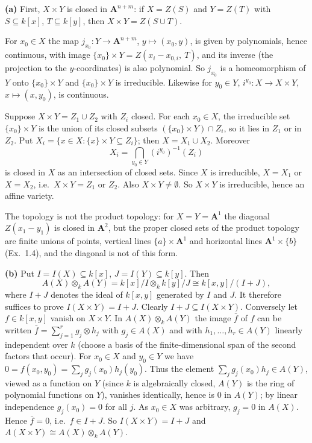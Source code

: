 \documentclass[11pt]{article}
\begin{document}
\textbf{(a)} First, $X\times Y$ is closed in $\mathbf A^{n+m}$: if $X=Z(S)$ and $Y=Z(T)$ with $S\subseteq k[x]$, $T\subseteq k[y]$, then $X\times Y=Z(S\cup T)$.

For $x_0\in X$ the map $j_{x_0}\colon Y\to \mathbf A^{n+m}$, $y\mapsto(x_0,y)$, is given by polynomials, hence continuous, with image $\{x_0\}\times Y=Z(x_i-x_{0,i},\ T)$, and its inverse (the projection to the $y$-coordinates) is also polynomial. So $j_{x_0}$ is a homeomorphism of $Y$ onto $\{x_0\}\times Y$ and $\{x_0\}\times Y$ is irreducible. Likewise for $y_0\in Y$, $i^{y_0}\colon X\to X\times Y$, $x\mapsto(x,y_0)$, is continuous.

Suppose $X\times Y=Z_1\cup Z_2$ with $Z_i$ closed. For each $x_0\in X$, the irreducible set $\{x_0\}\times Y$ is the union of its closed subsets $(\{x_0\}\times Y)\cap Z_i$, so it lies in $Z_1$ or in $Z_2$. Put $X_i=\{x\in X:\{x\}\times Y\subseteq Z_i\}$; then $X=X_1\cup X_2$. Moreover
\[
X_i=\bigcap_{y_0\in Y}(i^{y_0})^{-1}(Z_i)
\]
is closed in $X$ as an intersection of closed sets. Since $X$ is irreducible, $X=X_1$ or $X=X_2$, i.e.\ $X\times Y=Z_1$ or $Z_2$. Also $X\times Y\ne\emptyset$. So $X\times Y$ is irreducible, hence an affine variety.

The topology is not the product topology: for $X=Y=\mathbf A^1$ the diagonal $Z(x_1-y_1)$ is closed in $\mathbf A^2$, but the proper closed sets of the product topology are finite unions of points, vertical lines $\{a\}\times\mathbf A^1$ and horizontal lines $\mathbf A^1\times\{b\}$ (Ex.~1.4), and the diagonal is not of this form.

\textbf{(b)} Put $I=I(X)\subseteq k[x]$, $J=I(Y)\subseteq k[y]$. Then
\[
A(X)\otimes_kA(Y)=k[x]/I\otimes_kk[y]/J\cong k[x,y]/(I+J),
\]
where $I+J$ denotes the ideal of $k[x,y]$ generated by $I$ and $J$. It therefore suffices to prove $I(X\times Y)=I+J$. Clearly $I+J\subseteq I(X\times Y)$. Conversely let $f\in k[x,y]$ vanish on $X\times Y$. In $A(X)\otimes_kA(Y)$ the image $\bar f$ of $f$ can be written $\bar f=\sum_{j=1}^rg_j\otimes h_j$ with $g_j\in A(X)$ and with $h_1,\dots,h_r\in A(Y)$ linearly independent over $k$ (choose a basis of the finite-dimensional span of the second factors that occur). For $x_0\in X$ and $y_0\in Y$ we have $0=f(x_0,y_0)=\sum_jg_j(x_0)h_j(y_0)$. Thus the element $\sum_jg_j(x_0)h_j\in A(Y)$, viewed as a function on $Y$ (since $k$ is algebraically closed, $A(Y)$ is the ring of polynomial functions on $Y$), vanishes identically, hence is $0$ in $A(Y)$; by linear independence $g_j(x_0)=0$ for all $j$. As $x_0\in X$ was arbitrary, $g_j=0$ in $A(X)$. Hence $\bar f=0$, i.e.\ $f\in I+J$. So $I(X\times Y)=I+J$ and $A(X\times Y)\cong A(X)\otimes_kA(Y)$.
\end{document}
